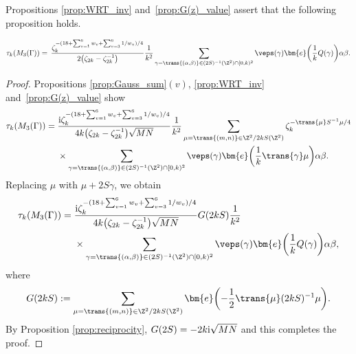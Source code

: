 Propositions \ref{prop:WRT_inv} and~\ref{prop:G(z)_value} assert that the following proposition holds.
\begin{prop}%
	\begin{align*}
		\tau_k(M_3(\Gamma)) = \, \frac{\zeta_{k}^{-(18 + \sum_{v=1}^{6}w_{v} + \sum_{v=3}^{6} 1/w_{v})/4}}{2 \big(\zeta_{2k}-\zeta_{2k}^{-1}\big)}
		\frac{1}{k^{2}} \sum_{ \gamma = \trans{(\alpha, \beta)} \in (2S)^{-1}(\Z^2) \cap [0, k)^2}
		\veps(\gamma) \bm{e}\bigg( \frac{1}{k} Q(\gamma) \bigg) \alpha \beta.
	\end{align*}
\end{prop}
\begin{proof}
	Propositions \ref{prop:Gauss_sum}$(v)$, \ref{prop:WRT_inv} and~\ref{prop:G(z)_value} show
	\begin{align*}
		\tau_k(M_3(\Gamma)) = {} &\frac{{\rm i} \zeta_{k}^{-(18 + \sum_{v=1}^{6}w_{v} + \sum_{v=3}^{6} 1/w_{v})/4}}{4k \big(\zeta_{2k}-\zeta_{2k}^{-1}\big) \sqrt{MN}}
		\frac{1}{k^2} \sum_{\mu = \trans{(m, n)} \in \Z^2/2kS(\Z^2)}
		\zeta_k^{-\trans{\mu} S^{-1} \mu/4}
\\
		&\times\sum_{\gamma = \trans{(\alpha, \beta)} \in (2S)^{-1}(\Z^2) \cap [0, k)^2}
		\veps(\gamma) \bm{e}\bigg( \frac{1}{k} \trans{\gamma} \mu \bigg) \alpha \beta.
	\end{align*}
	Replacing $ \mu $ with $ \mu + 2S\gamma $, we obtain
	\begin{align*}
	\tau_k(M_3(\Gamma)) = {}&\frac{{\rm i} \zeta_{k}^{-(18 + \sum_{v=1}^{6}w_{v} + \sum_{v=3}^{6} 1/w_{v})/4}}{4k \big(\zeta_{2k}-\zeta_{2k}^{-1}\big) \sqrt{MN}} G(2kS)
	\frac{1}{k^2}
\\
&\times\sum_{ \gamma = \trans{(\alpha, \beta)} \in (2S)^{-1}(\Z^2) \cap [0, k)^2}
	\veps(\gamma) \bm{e}\bigg( \frac{1}{k} Q(\gamma) \bigg) \alpha \beta,
	\end{align*}
	where
	\begin{gather*}
	G(2kS) := \sum_{\mu = \trans{(m, n)} \in \Z^2/2kS(\Z^2)} \bm{e}\bigg({-}\frac{1}{2} \trans{\mu} (2kS)^{-1} \mu \bigg).
	\end{gather*}
	By Proposition \ref{prop:reciprocity}, $ G(2S) = -2k{\rm i} \sqrt{MN} $ and this completes the proof.
\end{proof}

